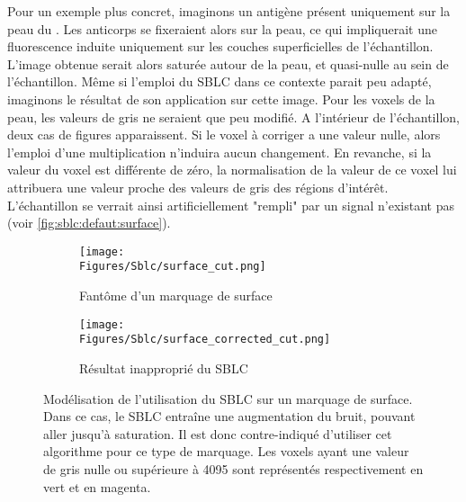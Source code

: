 \documentclass[\main/main.tex]{subfiles}
\begin{document}
%
Pour un exemple plus concret, imaginons un antigène présent uniquement sur la peau du \pz{}.
%
Les anticorps se fixeraient alors sur la peau, ce qui impliquerait une fluorescence induite uniquement sur les couches superficielles de l'échantillon.
%
L'image obtenue serait alors saturée autour de la peau, et quasi-nulle au sein de l'échantillon.
%
Même si l'emploi du SBLC dans ce contexte parait peu adapté, imaginons le résultat de son application sur cette image.
%
Pour les voxels de la peau, les valeurs de gris ne seraient que peu modifié.
%
A l'intérieur de l'échantillon, deux cas de figures apparaissent.
%
Si le voxel à corriger a une valeur nulle, alors l'emploi d'une multiplication n'induira aucun changement.
%
En revanche, si la valeur du voxel est différente de zéro, la normalisation de la valeur de ce voxel lui attribuera une valeur proche des valeurs de gris des régions d'intérêt.
%
L'échantillon se verrait ainsi artificiellement "rempli" par un signal n'existant pas (voir \autoref{fig:sblc:defaut:surface}).

\begin{figure}[h!]
    \centering
    \begin{subfigure}[b]{0.45\textwidth}
        
        \caption{Fantôme d'un marquage de surface}
        \centering \texttt{[image: \\Figures/Sblc/surface\_cut.png]}
        \label{fig:sblc:defaut:surface:fantôme}
    \end{subfigure}
    \begin{subfigure}[b]{0.45\textwidth} 
        \caption{Résultat inapproprié du SBLC}
        \centering \texttt{[image: \\Figures/Sblc/surface\_corrected\_cut.png]}
        \label{fig:sblc:defaut:surface:application}
    \end{subfigure}
    \caption{
        Modélisation de l'utilisation du SBLC sur un marquage de surface.
        \newline
        Dans ce cas, le SBLC entraîne une augmentation du bruit, pouvant aller jusqu'à saturation.
        Il est donc contre\hyp{}indiqué d'utiliser cet algorithme pour ce type de marquage.
        \newline
        Les voxels ayant une valeur de gris nulle ou supérieure à 4095 sont représentés respectivement en vert et en magenta.
        }
    \label{fig:sblc:defaut:surface}
\end{figure}
\end{document}
